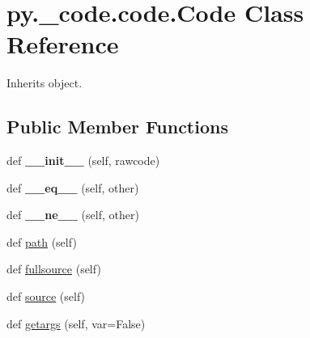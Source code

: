\hypertarget{classpy_1_1__code_1_1code_1_1_code}{}\section{py.\+\_\+code.\+code.\+Code Class Reference}
\label{classpy_1_1__code_1_1code_1_1_code}


Inherits object.

\subsection*{Public Member Functions}
\begin{DoxyCompactItemize}
\item 
\mbox{\label{classpy_1_1__code_1_1code_1_1_code_a2462806852c199245d2bbe7fe81e970e}} 
def {\bfseries \+\_\+\+\_\+init\+\_\+\+\_\+} (self, rawcode)
\item 
\mbox{\label{classpy_1_1__code_1_1code_1_1_code_ab8095d8639a40f7a0e6ac406aeb4d174}} 
def {\bfseries \+\_\+\+\_\+eq\+\_\+\+\_\+} (self, other)
\item 
\mbox{\label{classpy_1_1__code_1_1code_1_1_code_a641bfe6b27f3419c4b810515106d35f5}} 
def {\bfseries \+\_\+\+\_\+ne\+\_\+\+\_\+} (self, other)
\item 
def \hyperlink{classpy_1_1__code_1_1code_1_1_code_a84e26981617ad90d0fe872b367058f29}{path} (self)
\item 
def \hyperlink{classpy_1_1__code_1_1code_1_1_code_ac0021a93e7f7438bbba8389ba07cc37b}{fullsource} (self)
\item 
def \hyperlink{classpy_1_1__code_1_1code_1_1_code_a9edbde33c7061882644a27dae8fb3441}{source} (self)
\item 
def \hyperlink{classpy_1_1__code_1_1code_1_1_code_ae3526891049d1b433a3e86b8fe03077c}{getargs} (self, var=False)
\end{DoxyCompactItemize}
